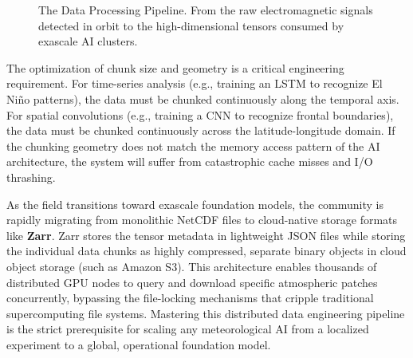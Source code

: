 \begin{figure}[H]
\centering
{}
\caption{The Data Processing Pipeline. From the raw electromagnetic signals detected in orbit to the high-dimensional tensors consumed by exascale AI clusters.}
\label{fig:data_pipeline_tikz}
\end{figure}

The optimization of chunk size and geometry is a critical engineering requirement. For time-series analysis (e.g., training an LSTM to recognize El Niño patterns), the data must be chunked continuously along the temporal axis. For spatial convolutions (e.g., training a CNN to recognize frontal boundaries), the data must be chunked continuously across the latitude-longitude domain. If the chunking geometry does not match the memory access pattern of the AI architecture, the system will suffer from catastrophic cache misses and I/O thrashing.

As the field transitions toward exascale foundation models, the community is rapidly migrating from monolithic NetCDF files to cloud-native storage formats like \textbf{Zarr}. Zarr stores the tensor metadata in lightweight JSON files while storing the individual data chunks as highly compressed, separate binary objects in cloud object storage (such as Amazon S3). This architecture enables thousands of distributed GPU nodes to query and download specific atmospheric patches concurrently, bypassing the file-locking mechanisms that cripple traditional supercomputing file systems. Mastering this distributed data engineering pipeline is the strict prerequisite for scaling any meteorological AI from a localized experiment to a global, operational foundation model.

